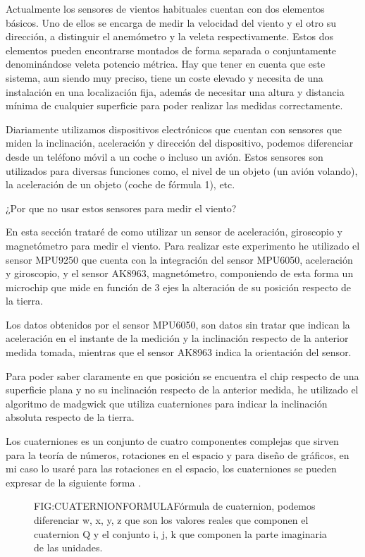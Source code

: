 
 Actualmente los sensores de vientos habituales cuentan con dos elementos básicos. Uno de ellos se encarga de medir la velocidad del viento y el otro su dirección, a distinguir el anemómetro y la veleta respectivamente. Estos dos elementos pueden encontrarse montados de forma separada o conjuntamente denominándose veleta potencio métrica.
 Hay que tener en cuenta que este sistema, aun siendo muy preciso, tiene un coste elevado y necesita de una instalación en una localización fija, además de necesitar una altura y distancia mínima de cualquier superficie para poder realizar las medidas correctamente.
 
 Diariamente utilizamos dispositivos electrónicos que cuentan con sensores que miden la inclinación, aceleración y dirección del dispositivo, podemos diferenciar desde un teléfono móvil a un coche o incluso un avión.
 Estos sensores son utilizados para diversas funciones como, el nivel de un objeto (un avión volando), la aceleración de un objeto (coche de fórmula 1), etc.
 
 ¿Por que no usar estos sensores para medir el viento?
 
 En esta sección trataré de como utilizar un sensor de aceleración, giroscopio y magnetómetro para medir el viento.
 Para realizar este experimento he utilizado el sensor MPU9250\cite{InvenSense2016} que cuenta con la integración del sensor MPU6050, aceleración y giroscopio, y el sensor AK8963, magnetómetro, componiendo de esta forma un microchip que mide en función de 3 ejes la alteración de su posición respecto de la tierra.
 
 Los datos obtenidos por el sensor MPU6050, son datos sin tratar que indican la aceleración en el instante de la medición y la inclinación respecto de la anterior medida tomada, mientras que el sensor AK8963 indica la orientación del sensor.
 
 Para poder saber claramente en que posición se encuentra el chip respecto de una superficie plana y no su inclinación respecto de la anterior medida, he utilizado el algoritmo de madgwick que utiliza cuaterniones para indicar la inclinación absoluta respecto de la tierra. 
 
 Los cuaterniones es un conjunto de cuatro componentes complejas que sirven para la teoría de números, rotaciones en el espacio y para diseño de gráficos, en mi caso lo usaré para las rotaciones en el espacio, los cuaterniones se pueden expresar de la siguiente forma \cite{Graves1999}.
 
\begin{figure}{FIG:CUATERNIONFORMULA}{Fórmula de cuaternion, podemos diferenciar w, x, y, z que son los valores reales que componen el cuaternion Q y el conjunto i, j, k que componen la parte imaginaria de las unidades. }
\end{figure}

